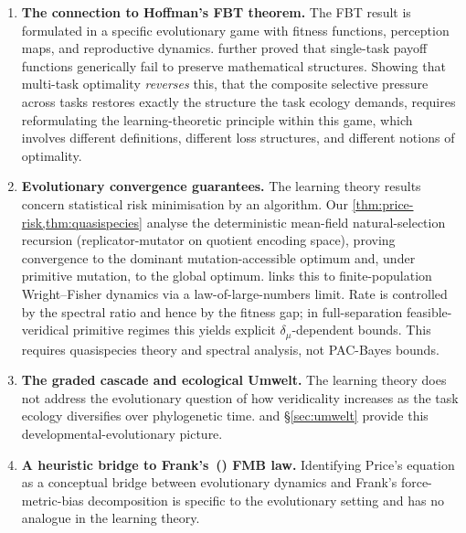 \documentclass[12pt]{article}
\newcommand{\dmu}{\delta_\mu}
\begin{document}
\begin{enumerate}[leftmargin=*]
\item \textbf{The connection to Hoffman's FBT theorem.} The FBT result is formulated in a specific evolutionary game with fitness functions, perception maps, and reproductive dynamics. \citet{prakash_etal_2020} further proved that single-task payoff functions generically fail to preserve mathematical structures. Showing that multi-task optimality \emph{reverses} this, that the composite selective pressure across tasks restores exactly the structure the task ecology demands, requires reformulating the learning-theoretic principle within this game, which involves different definitions, different loss structures, and different notions of optimality.

\item \textbf{Evolutionary convergence guarantees.} The learning theory results concern statistical risk minimisation by an algorithm. Our \cref{thm:price-risk,thm:quasispecies} analyse the deterministic mean-field natural-selection recursion (replicator-mutator on quotient encoding space), proving convergence to the dominant mutation-accessible optimum and, under primitive mutation, to the global optimum.  links this to finite-population Wright--Fisher dynamics via a law-of-large-numbers limit. Rate is controlled by the spectral ratio and hence by the fitness gap; in full-separation feasible-veridical primitive regimes this yields explicit $\dmu$-dependent bounds. This requires quasispecies theory and spectral analysis, not PAC-Bayes bounds.

\item \textbf{The graded cascade and ecological Umwelt.} The learning theory does not address the evolutionary question of how veridicality increases as the task ecology diversifies over phylogenetic time.  and \S\ref{sec:umwelt} provide this developmental-evolutionary picture.

\item \textbf{A heuristic bridge to Frank's~(\citeyear{frank_2025}) FMB law.} Identifying Price's equation as a conceptual bridge between evolutionary dynamics and Frank's force-metric-bias decomposition is specific to the evolutionary setting and has no analogue in the learning theory.
\end{enumerate}
\end{document}
